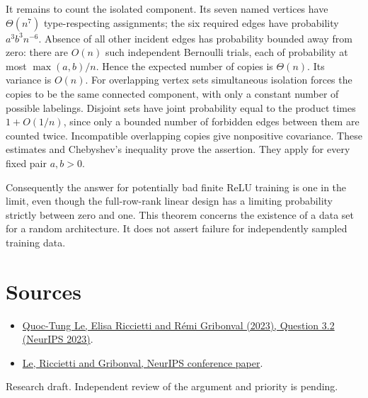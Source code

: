 \documentclass[10pt]{article}
\begin{document}
It remains to count the isolated component. Its seven named vertices have $\Theta(n^7)$ type-respecting assignments; the six required edges have probability $a^3b^3 n^{-6}$. Absence of all other incident edges has probability bounded away from zero: there are $O(n)$ such independent Bernoulli trials, each of probability at most $\max(a,b)/n$. Hence the expected number of copies is $\Theta(n)$. Its variance is $O(n)$. For overlapping vertex sets simultaneous isolation forces the copies to be the same connected component, with only a constant number of possible labelings. Disjoint sets have joint probability equal to the product times $1+O(1/n)$, since only a bounded number of forbidden edges between them are counted twice. Incompatible overlapping copies give nonpositive covariance. These estimates and Chebyshev's inequality prove the assertion. They apply for every fixed pair $a,b>0$.

Consequently the answer for potentially bad finite ReLU training is one in the limit, even though the full-row-rank linear design has a limiting probability strictly between zero and one. This theorem concerns the existence of a data set for a random architecture. It does not assert failure for independently sampled training data.

\section*{Sources}
\begin{itemize}\setlength{\itemsep}{0pt}\setlength{\parskip}{0pt}
\item \href{https://arxiv.org/abs/2306.02666}{Quoc-Tung Le, Elisa Riccietti and Rémi Gribonval (2023), Question 3.2 (NeurIPS 2023)}.
\item \href{https://proceedings.neurips.cc/paper_files/paper/2023/file/cdda0657a9f32bc7ddd4343686e7371e-Paper-Conference.pdf}{Le, Riccietti and Gribonval, NeurIPS conference paper}.
\end{itemize}
{\small Research draft. Independent review of the argument and priority is pending.}
\end{document}
